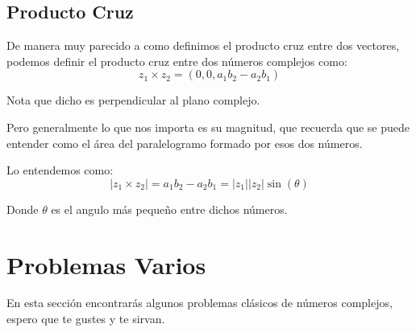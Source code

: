 \documentclass[12pt, fleqn]{report}                             %
\newcommand \Quote              {\qq}                           %
\theoremstyle{break}                                            %
\newcommand{\Wrap}[1]           {\left( #1 \right)}             %
\newcommand{\Sin}[1] {\sin\Wrap{#1}}                            %
\begin{document}
            \subsection{Producto Cruz}

                De manera muy parecido a como definimos el producto cruz entre dos
                vectores, podemos definir el producto cruz entre dos números complejos
                como:
                \begin{equation}
                    z_1 \times z_2 = (0, 0, a_1 b_2 - a_2 b_1)
                \end{equation}

                Nota que dicho \Quote{vector} es perpendicular al plano complejo.

                Pero generalmente lo que nos importa es su magnitud, que recuerda
                que se puede entender como el área del paralelogramo formado por
                esos dos números.

                Lo entendemos como:
                \begin{equation}
                    |z_1 \times z_2|
                        = a_1 b_2 - a_2 b_1 
                        = |z_1||z_2| \Sin{\theta}
                \end{equation}

                Donde $\theta$ es el angulo más pequeño entre dichos números.


        \clearpage
        \section{Problemas Varios}

            En esta sección encontrarás algunos problemas clásicos de números
            complejos, espero que te gustes y te sirvan.
\end{document}
